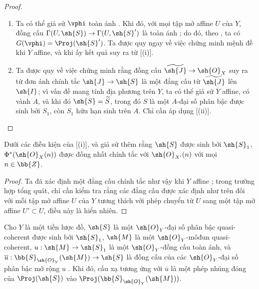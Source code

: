 \documentclass[oneside,10pt]{amsart}
\makeatletter
\newcommand{\ega@arrow}[2]{\mathchoice{#1}{#2}{#2}{#2}}
\renewcommand{\to}{\ega@arrow{\longrightarrow}{\rightarrow}}
\let\EGAOriginalLabel\label
\renewcommand{\label}[1]{\phantomsection\EGAOriginalLabel{#1}}
\makeatother
\begin{document}
\begin{proof}
\medskip\noindent
\begin{enumerate}
  \item[(i)] Ta có thể giả sử $\vphi$ toàn ánh .
    Khi đó, với mọi tập mở affine $U$ của $Y$, đồng cấu $\Gamma(U,\sh{S})\to\Gamma(U,\sh{S}')$ là toàn ánh ; do đó, theo , ta có $G(\vphi)=\Proj(\sh{S}')$.
    Ta được quy ngay về việc chứng minh mệnh đề khi $Y$ affine, và khi ấy kết quả suy ra từ [(i)].
  \item[(ii)] Ta được quy về việc chứng minh rằng đồng cấu $\widetilde{\sh{J}}\to\sh{O}_X$ suy ra từ đơn ánh chính tắc $\sh{J}\to\sh{S}$ là một đẳng cấu từ $\widetilde{\sh{J}}$ lên $\sh{I}$;
    vì vấn đề mang tính địa phương trên $Y$, ta có thể giả sử $Y$ affine, có vành $A$, và khi đó $\sh{S}=\widetilde{S}$, trong đó $S$ là một $A$-đại số phân bậc được sinh bởi $S_1$, còn $S_1$ hữu hạn sinh trên $A$.
    Chỉ cần áp dụng [(ii)].
\end{enumerate}
\end{proof}

\begin{corollary}[3.6.3]
\label{II.3.6.3}
Dưới các điều kiện của [(i)], và giả sử thêm rằng $\sh{S}$ được sinh bởi $\sh{S}_1$, $\Phi^*(\sh{O}_X(n))$ được đồng nhất chính tắc với $\sh{O}_{X'}(n)$ với mọi $n\in\bb{Z}$.
\end{corollary}

\begin{proof}
Ta đã xác định một đẳng cấu chính tắc như vậy khi $Y$ affine ;
trong trường hợp tổng quát, chỉ cần kiểm tra rằng các đẳng cấu được xác định như trên đối với mỗi tập mở affine $U$ của $Y$ tương thích với phép chuyển từ $U$ sang một tập mở affine $U'\subset U$, điều này là hiển nhiên.
\end{proof}

\begin{corollary}[3.6.4]
\label{II.3.6.4}
Cho $Y$ là một tiền lược đồ, $\sh{S}$ là một $\sh{O}_Y$-đại số phân bậc quasi-coherent được sinh bởi $\sh{S}_1$, $\sh{M}$ là một $\sh{O}_Y$-môđun quasi-coherent, $u:\sh{M}\to\sh{S}_1$ là một $\sh{O}_Y$-đồng cấu toàn ánh, và $\overline{u}:\bb{S}_{\sh{O}_Y}(\sh{M})\to\sh{S}$ là đồng cấu của các $\sh{O}_Y$-đại số phân bậc mở rộng $u$ .
Khi đó, cấu xạ tương ứng với $\overline{u}$ là một phép nhúng đóng của $\Proj(\sh{S})$ vào $\Proj(\bb{S}_{\sh{O}_Y}(\sh{M}))$.
\end{corollary}
\end{document}
